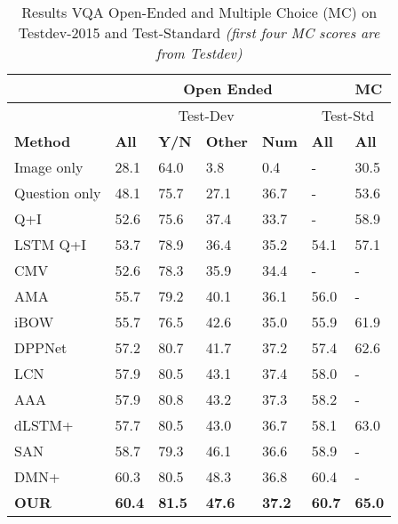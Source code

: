 \begin{table}[]
\centering
\caption{Results VQA Open-Ended and Multiple Choice (MC) on Testdev-2015 and Test-Standard \textit{\tiny{(first four MC scores are from Testdev)}}}
\label{my-label}
\begin{tabular}{|l|l|l|l|l|l| l|}
\hline
  & \multicolumn{5}{|c|}{Open Ended}  & MC  \\
  \hline
 & \multicolumn{4}{|c|}{Test-Dev}  & \multicolumn{2}{|c|}{Test-Std} \\
\hline


\textbf{Method} & \textbf{All}  &\textbf{ Y/N}  & \textbf{Other}  & \textbf{Num} & \textbf{All} & \textbf{All}  \\ \hline \hline
Image only& 28.1& 64.0& 3.8& 0.4& - & 30.5\\ \hline
Question only& 48.1& 75.7& 27.1& 36.7& - & 53.6\\ \hline
Q+I& 52.6& 75.6& 37.4& 33.7& - & 58.9\\ \hline
LSTM Q+I& 53.7& 78.9& 36.4& 35.2& 54.1 & 57.1\\ \hline
CMV \cite{jiang2015compositional} & 52.6& 78.3& 35.9& 34.4& - & -\\ \hline 
AMA \cite{wu2015ask} & 55.7& 79.2& 40.1& 36.1& 56.0 & -\\ \hline
iBOW \cite{zhou2015simple} & 55.7& 76.5& 42.6& 35.0& 55.9 & 61.9\\ \hline
DPPNet \cite{noh2015image}& 57.2& 80.7& 41.7& 37.2& 57.4 & 62.6\\ \hline
LCN \cite{andreas2016learning} & 57.9& 80.5& 43.1& 37.4& 58.0 & -\\ \hline
AAA \cite{xu2015ask} & 57.9& 80.8& 43.2& 37.3& 58.2 & -\\ \hline
dLSTM+ \cite{Lu2015} & 57.7& 80.5& 43.0& 36.7& 58.1 & 63.0\\ \hline
SAN \cite{yang2015stacked} & 58.7& 79.3& 46.1& 36.6& 58.9 & -\\ \hline
DMN+ \cite{xiong2016dynamic} & 60.3& 80.5& 48.3& 36.8& 60.4 & -\\ \hline
\textbf{OUR} & \textbf{60.4}& \textbf{81.5}& \textbf{47.6}& \textbf{37.2}& \textbf{60.7} & \textbf{65.0} \\ \hline

\end{tabular}
\end{table}
